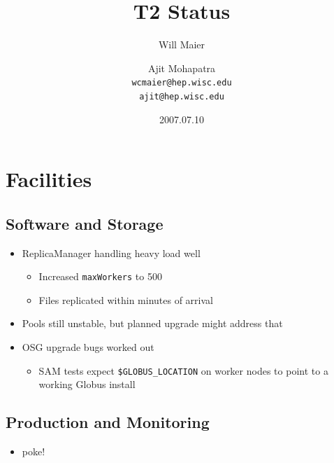 \documentclass{beamer}
\title{T2 Status}
\author[Maier, Mohapatra]{
    Will Maier \and Ajit Mohapatra\\ 
    {\tt wcmaier@hep.wisc.edu}\\
    {\tt ajit@hep.wisc.edu}}
\institute[Wisconsin]{University of Wisconsin - High Energy Physics}
\date{2007.07.10}
\begin{document}
\begin{frame}
    \titlepage
\end{frame}

\section{Facilities}
\subsection{Software and Storage}
\begin{frame}
\begin{itemize}
    \item ReplicaManager handling heavy load well
    \begin{itemize}
        \item Increased {\tt maxWorkers} to 500
        \item Files replicated within minutes of arrival
    \end{itemize}
    \item Pools still unstable, but planned upgrade might address that
    \item OSG upgrade bugs worked out
    \begin{itemize}
        \item SAM tests expect {\tt \$GLOBUS_LOCATION} on worker nodes to point 
        to a working Globus install
    \end{itemize}
\end{itemize}
\end{frame}

\subsection{Production and Monitoring}
\begin{frame}
\begin{itemize}
    \item poke!
\end{itemize}
\end{frame}
\end{document}
